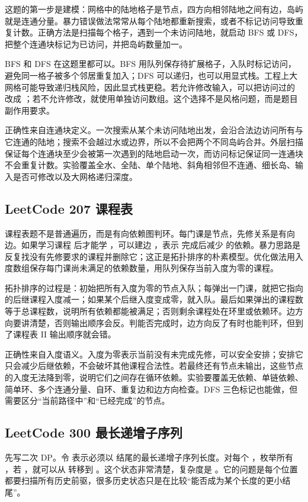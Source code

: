 这题的第一步是建模：网格中的陆地格子是节点，四方向相邻陆地之间有边，岛屿就是连通分量。暴力错误做法常常从每个陆地都重新搜索，或者不标记访问导致重复计数。正确方法是扫描每个格子，遇到一个未访问陆地，就启动 BFS 或 DFS，把整个连通块标记为已访问，并把岛屿数量加一。

BFS 和 DFS 在这题里都可以。BFS 用队列保存待扩展格子，入队时标记访问，避免同一格子被多个邻居重复加入；DFS 可以递归，也可以用显式栈。工程上大网格可能导致递归栈风险，因此显式栈更稳。若允许修改输入，可以把访问过的  改成 ；若不允许修改，就使用单独访问数组。这个选择不是风格问题，而是题目副作用要求。

正确性来自连通块定义。一次搜索从某个未访问陆地出发，会沿合法边访问所有与它连通的陆地；搜索不会越过水或边界，所以不会把两个不同岛屿合并。外层扫描保证每个连通块至少会被第一次遇到的陆地启动一次，而访问标记保证同一连通块不会重复计数。实验覆盖全水、全陆、单个陆地、斜角相邻但不连通、细长岛、输入是否可修改以及大网格递归深度。

\subsection{LeetCode 207 课程表}

课程表题不是普通遍历，而是有向依赖图判环。每门课是节点，先修关系是有向边。如果学习课程  后才能学 ，可以建边 ，表示  完成后减少  的依赖。暴力思路是反复找没有先修要求的课程并删除它；这正是拓扑排序的朴素模型。优化做法用入度数组保存每门课尚未满足的依赖数量，用队列保存当前入度为零的课程。

拓扑排序的过程是：初始把所有入度为零的节点入队；每弹出一门课，就把它指向的后继课程入度减一；如果某个后继入度变成零，就入队。最后如果弹出的课程数等于总课程数，说明所有依赖都能被满足；否则剩余课程处在环里或依赖环。边方向要讲清楚，否则输出顺序会反。判能否完成时，边方向反了有时也能判环，但到了课程表 II 输出顺序就会错。

正确性来自入度语义。入度为零表示当前没有未完成先修，可以安全安排；安排它只会减少后继依赖，不会破坏其他课程合法性。若最终还有节点未输出，这些节点的入度无法降到零，说明它们之间存在循环依赖。实验要覆盖无依赖、单链依赖、简单环、多个连通分量、自环、重复边和边方向检查。DFS 三色标记也能做，但需要区分“当前路径中”和“已经完成”的节点。

\subsection{LeetCode 300 最长递增子序列}

先写二次 DP。令  表示必须以  结尾的最长递增子序列长度。对每个 ，枚举所有 ，若 ，就可以从  转移到 。这个状态非常清楚，复杂度是 。它的问题是每个位置都要扫描所有历史前驱，很多历史状态只是在比较“能否成为某个长度的更小结尾”。

